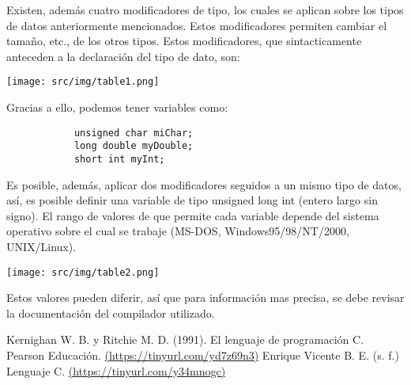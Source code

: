 \documentclass[letterpaper, 12pt]{article}
\begin{document}
        Existen, además cuatro modificadores de tipo, los cuales se aplican sobre los tipos de datos anteriormente
        mencionados. Estos modificadores permiten cambiar el tamaño, etc., de los otros tipos.
        Estos modificadores, que sintacticamente anteceden a la declaración del tipo de dato, son:
            
        \begin{center}
            \texttt{[image: src/img/table1.png]}
        \end{center}

        Gracias a ello, podemos tener variables como:

        \begin{verbatim}
            unsigned char miChar;
            long double myDouble;
            short int myInt;
        \end{verbatim}

        Es posible, además, aplicar dos modificadores seguidos a un mismo tipo de
        datos, así, es posible definir una variable de tipo unsigned long int (entero largo sin
        signo). El rango de valores de que permite cada variable depende del sistema operativo
        sobre el cual se trabaje (MS-DOS, Windows95/98/NT/2000, UNIX/Linux).

        \begin{center}
            \texttt{[image: src/img/table2.png]}
        \end{center}

        Estos valores pueden diferir, así que para información mas precisa, se debe revisar la documentación
        del compilador utilizado.

        \newpage

        \begin{thebibliography}{0}
             Kernighan W. B. y Ritchie M. D. (1991). El lenguaje de programación C. Pearson Educación. \href{https://tinyurl.com/yd7z69n3}{(https://tinyurl.com/yd7z69n3)}
             Enrique Vicente B. E. (s. f.) Lenguaje C. \href{https://tinyurl.com/y34mnogc}{(https://tinyurl.com/y34mnogc)}
        \end{thebibliography}
\end{document}
